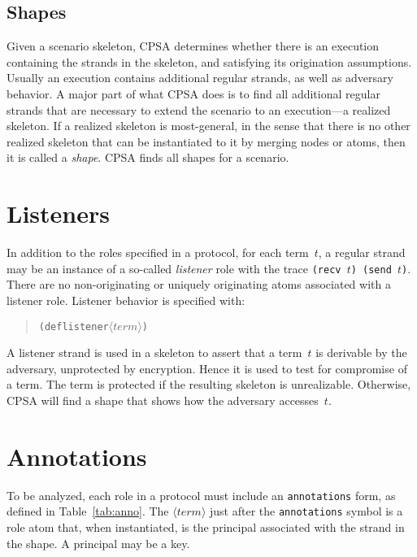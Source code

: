 \documentclass[12pt]{article}
\newcommand{\nterm}[1]{\ensuremath{\langle\mathit{#1}\rangle}}
\begin{document}
\subsection{Shapes}

Given a scenario skeleton, CPSA determines whether there is an execution
containing the strands in the skeleton, and satisfying its
origination assumptions.  Usually an execution contains additional
regular strands, as well as adversary behavior.  A major part of what
CPSA does is to find all additional regular strands that are necessary
to extend the scenario to an execution---a realized skeleton.  If a
realized skeleton is most-general, in the sense that there is no other
realized skeleton that can be instantiated to it by merging nodes or
atoms, then it is called a {\em shape}. CPSA finds all shapes for a
scenario.

\section{Listeners}

In addition to the roles specified in a protocol, for each term~$t$, a
regular strand may be an instance of a so-called {\em listener} role
with the trace \texttt{(recv~$t$) (send~$t$)}.  There are no
non-originating or uniquely originating atoms associated with a
listener role.  Listener behavior is specified with:
\begin{quote}
\begin{alltt}
(deflistener \nterm{term})
\end{alltt}
\end{quote}

A listener strand is used in a skeleton to assert that a term~$t$ is
derivable by the adversary, unprotected by encryption.  Hence it is used
to test for compromise of a term.  The term is protected if the
resulting skeleton is unrealizable.  Otherwise, CPSA will find a shape
that shows how the adversary accesses~$t$.

\section{Annotations}

To be analyzed, each role in a protocol must include an
\texttt{annotations} form, as defined in Table~\ref{tab:anno}.  The
\nterm{term} just after the \texttt{annotations} symbol is a role atom
that, when instantiated, is the principal associated with the strand in
the shape.  A principal may be a key.
\end{document}
